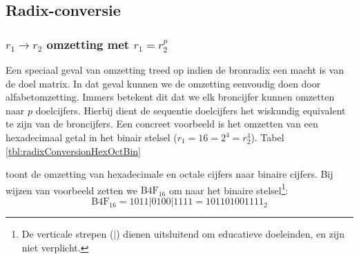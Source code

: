 \subsection{Radix-conversie}
\subsubsection{$r_1\rightarrow r_2$ omzetting met $r_1=r_2^p$}
Een speciaal geval van omzetting treed op indien de bronradix een macht is van de doel matrix. In dat geval kunnen we de omzetting eenvoudig doen door alfabetomzetting. Immers betekent dit dat we elk broncijfer kunnen omzetten naar $p$ doelcijfers. Hierbij dient de sequentie doelcijfers het wiskundig equivalent te zijn van de broncijfers. Een concreet voorbeeld is het omzetten van een hexadecimaal getal in het binair stelsel ($r_1=16=2^4=r_2^4$). Tabel \ref{tbl:radixConversionHexOctBin}
\begin{table}[hbt]
\centering
{}
\caption{Radix-conversie van hexadecimaal en octaal naar binair.}
\label{tbl:radixConversionHexOctBin}
\end{table}
toont de omzetting van hexadecimale en octale cijfers naar binaire cijfers. Bij wijzen van voorbeeld zetten we $\mbox{B4F}_{16}$ om naar het binaire stelsel\footnote{De verticale strepen ($|$) dienen uitsluitend om educatieve doeleinden, en zijn niet verplicht.}:
\begin{equation}
\mbox{B4F}_{16}=1011|0100|1111=101101001111_2
\end{equation}
